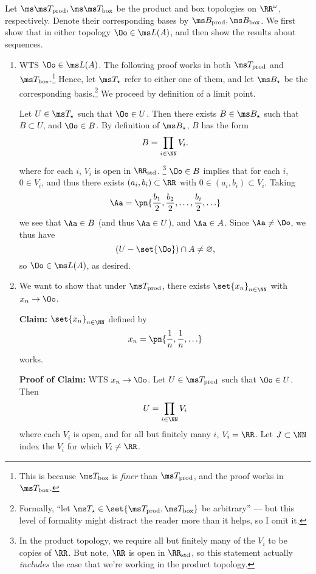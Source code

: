 \documentclass{fkpset}
\newcommand{\tprod}{\ensuremath \ms T_{\rm prod}}
\newcommand{\bprod}{\ensuremath \ms B_{\rm prod}}
\newcommand{\tbox}{\ensuremath \ms T_{\rm box}}
\newcommand{\bbox}{\ensuremath \ms B_{\rm box}}
\newcommand{\tstar}{\ensuremath \ms T_{\star}}
\newcommand{\bstar}{\ensuremath \ms B_{\star}}
\begin{document}
  \begin{solution}
    Let $\ms \tprod, \ms \tbox$ be the product and box topologies on
    $\RR^\omega$, respectively. Denote their corresponding bases by
    $\bprod, \bbox$. We first show that in either topology $\Oo \in
    \ms L(A)$, and then show the results about sequences.
    \begin{enumerate}[label=(\arabic*)]
      \item WTS $\Oo \in \ms L(A)$. The following proof works in both
        $\tprod$ and $\tbox$.\footnote{This is because $\tbox$ is
          \emph{finer} than $\tprod$, and the proof works in $\tbox$.}
        Hence, let $\tstar$ refer to either one of them, and let
        $\bstar$ be the corresponding basis.\footnote{Formally, ``let
          $\tstar \in \set{\tprod, \tbox}$ be arbitrary'' --- but this
          level of formality might distract the reader more than it
          helps, so I omit it.} We proceed by definition of a limit
        point.

        Let $U \in \tstar$ such that $\Oo \in U$. Then there exists $B
        \in \bstar$ such that $B \subset U$, and $\Oo \in B$. By
        definition of $\ms B_\star$, $B$ has the form
        \[
          B = \prod_{i \in \NN} V_i.
        \]
        where for each $i$, $V_i$ is open in $\RR_{\rm std}$.%
        \footnote{In the product topology, we require all but
          finitely many of the $V_i$ to be copies of $\RR$. But note,
          $\RR$ is open in $\RR_{\rm std}$, so this statement actually
          \emph{includes} the case that we're working in the product
          topology.} $\Oo \in B$ implies that for each $i$, $0 \in
        V_i$, and thus there exists $(a_i, b_i) \subset \RR$ with $0
        \in (a_i,b_i) \subset V_i$. Taking
        \[
          \Aa = \pn{\frac{b_1}{2}, \frac{b_2}{2}, \ldots,
            \frac{b_i}{2}, \ldots}
        \]
        we see that $\Aa \in B$ (and thus $\Aa \in U$), and $\Aa \in
        A$. Since $\Aa\neq \Oo$, we thus have
        \[
          (U - \set{\Oo}) \cap A \neq \varnothing,
        \]
        so $\Oo \in \ms L(A)$, as desired. \cmark
      \item We want to show that under $\tprod$, there exists
        $\set{x_n}_{n \in \NN}$ with $x_n \to \Oo$.

        \textbf{Claim:} $\set{x_n}_{n \in\NN}$ defined by
        \[
          x_n = \pn{\frac{1}{n}, \frac{1}{n}, \ldots}
        \]
        works.

        \textbf{Proof of Claim:} WTS $x_n \to \Oo$. Let $U \in \tprod$
        such that $\Oo \in U$. Then
        \[
          U = \prod_{i \in \NN} V_i
        \]
        where each $V_i$ is open, and for all but finitely many $i$,
        $V_i = \RR$. Let $J \subset \NN$ index the $V_i$ for which
        $V_i \neq \RR$.


\end{enumerate}
\end{solution}
\end{document}
